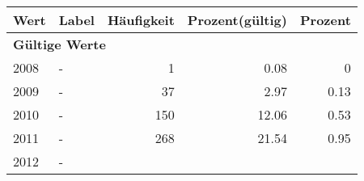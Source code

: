      \begin{longtable}{lXrrr}
     \toprule
     \textbf{Wert} & \textbf{Label} & \textbf{Häufigkeit} & \textbf{Prozent(gültig)} & \textbf{Prozent} \\
     \endhead
     \midrule
     \multicolumn{5}{l}{\textbf{Gültige Werte}}\\

     2008 &
     \multicolumn{1}{X}{ -  } &


       \num{1} &
       \num[round-mode=places,round-precision=2]{0.08} &
         \num[round-mode=places,round-precision=2]{0} \\

     2009 &
     \multicolumn{1}{X}{ -  } &


       \num{37} &
       \num[round-mode=places,round-precision=2]{2.97} &
         \num[round-mode=places,round-precision=2]{0.13} \\

     2010 &
     \multicolumn{1}{X}{ -  } &


       \num{150} &
       \num[round-mode=places,round-precision=2]{12.06} &
         \num[round-mode=places,round-precision=2]{0.53} \\

     2011 &
     \multicolumn{1}{X}{ -  } &


       \num{268} &
       \num[round-mode=places,round-precision=2]{21.54} &
         \num[round-mode=places,round-precision=2]{0.95} \\

     2012 &
     \multicolumn{1}{X}{ -  } &



\end{longtable}
